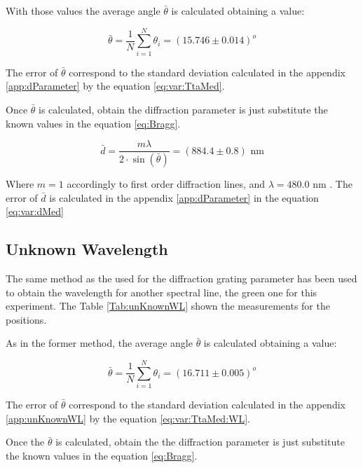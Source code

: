 \documentclass[twoside]{article}
\begin{document}
\begin{multicols}{2}
				With those values the average angle $\bar{\theta}$ is calculated obtaining a value:

					\begin{equation}
						\bar{\theta} = \frac{1}{N} \sum^{N}_{i=1} \theta_i = (15.746 \pm 0.014) ^o
					\end{equation}

				The error of $\bar{\theta}$ correspond to the standard deviation calculated in the appendix \ref{app:dParameter} by the equation \ref{eq:var:TtaMed}.

				Once $\bar{\theta}$ is calculated, obtain the diffraction parameter is just substitute the known values in the equation \ref{eq:Bragg}.

					\begin{equation}
						\bar{d} = \frac{m \lambda} {2 \cdot \sin(\bar{\theta})} = (884.4 \pm 0.8) \textrm{ nm}
						\label{eq:dMed}
					\end{equation}

				Where $m=1$ accordingly to first order diffraction lines, and $\lambda = 480.0$ nm \cite{Chema}. The error of $\bar{d}$ is calculated in the appendix \ref{app:dParameter} in the equation \ref{eq:var:dMed}

 			\subsection{Unknown Wavelength}
				\label{sec:unKnownWL} 				

 				The same method as the used for the diffraction grating parameter has been used to obtain the wavelength for another spectral line, the green one for this experiment. The Table \ref{Tab:unKnownWL} shown the measurements for the positions.

 					

 				As in the former method, the average angle $\bar{\theta}$ is calculated obtaining a value:

					\begin{equation}
						\bar{\theta} = \frac{1}{N} \sum^{N}_{i=1} \theta_i = (16.711 \pm 0.005) ^o
					\end{equation}

				The error of $\bar{\theta}$ correspond to the standard deviation calculated in the appendix \ref{app:unKnownWL} by the equation \ref{eq:var:TtaMed:WL}.

				Once the $\bar{\theta}$ is calculated, obtain the the diffraction parameter is just substitute the known values in the equation \ref{eq:Bragg}.


\end{multicols}
\end{document}
